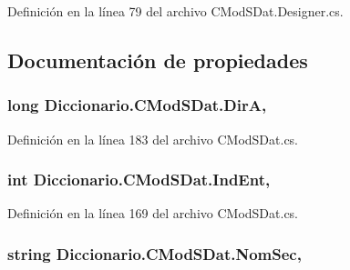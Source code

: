 Definición en la línea 79 del archivo C\-Mod\-S\-Dat.\-Designer.\-cs.



\subsection{Documentación de propiedades}
\hypertarget{class_diccionario_1_1_c_mod_s_dat_a0b2f77fbaa4198486d882b6f85cbfd93}{
\subsubsection[{Dir\-A}]{\setlength{\rightskip}{0pt plus 5cm}long Diccionario.\-C\-Mod\-S\-Dat.\-Dir\-A\hspace{0.3cm}{\ttfamily [get]}, {\ttfamily [set]}}}\label{class_diccionario_1_1_c_mod_s_dat_a0b2f77fbaa4198486d882b6f85cbfd93}


Definición en la línea 183 del archivo C\-Mod\-S\-Dat.\-cs.

\hypertarget{class_diccionario_1_1_c_mod_s_dat_a2d9a8c74c022e1b64a0a1cd8b3b2861d}{
\subsubsection[{Ind\-Ent}]{\setlength{\rightskip}{0pt plus 5cm}int Diccionario.\-C\-Mod\-S\-Dat.\-Ind\-Ent\hspace{0.3cm}{\ttfamily [get]}, {\ttfamily [set]}}}\label{class_diccionario_1_1_c_mod_s_dat_a2d9a8c74c022e1b64a0a1cd8b3b2861d}


Definición en la línea 169 del archivo C\-Mod\-S\-Dat.\-cs.

\hypertarget{class_diccionario_1_1_c_mod_s_dat_a2c94f712e797f345f883f20c5fb6ee2d}{
\subsubsection[{Nom\-Sec}]{\setlength{\rightskip}{0pt plus 5cm}string Diccionario.\-C\-Mod\-S\-Dat.\-Nom\-Sec\hspace{0.3cm}{\ttfamily [get]}, {\ttfamily [set]}}}\label{class_diccionario_1_1_c_mod_s_dat_a2c94f712e797f345f883f20c5fb6ee2d}


